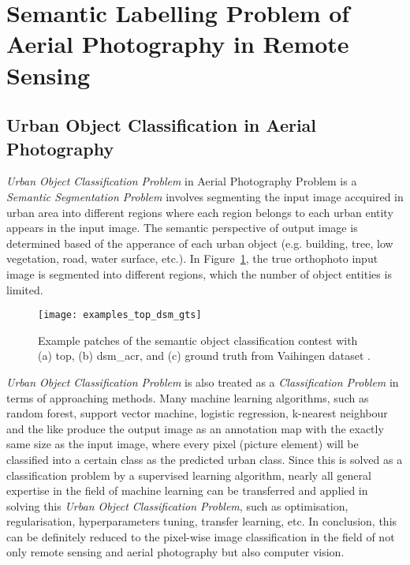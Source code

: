 \section{Semantic Labelling Problem of Aerial Photography in Remote Sensing}
\subsection{Urban Object Classification in Aerial Photography}
\emph{Urban Object Classification Problem} in Aerial Photography Problem is a
\emph{Semantic Segmentation Problem} involves segmenting the input image
accquired in urban area into different regions where each region belongs to
each urban entity appears in the input image. The semantic perspective of
output image is determined based of the apperance of each urban object (e.g.
building, tree, low vegetation, road, water surface, etc.). In
Figure~\ref{fig:examples_top_dsm_gts}, the true orthophoto input image is
segmented into different regions, which the number of object entities is
limited.
\begin{figure}[h]
    \centering
    \texttt{[image: examples\_top\_dsm\_gts]}
    \caption{
    Example patches of the semantic object classification contest with (a)
    \gls{top}, (b) \acrshort{dsm_acr}, and (c) ground truth from Vaihingen
    dataset \cite{vaihingen_isprs}.}
    \label{fig:examples_top_dsm_gts}
\end{figure}


\emph{Urban Object Classification Problem} is also treated as a
\emph{Classification Problem} in terms of approaching methods. Many machine
learning algorithms, such as random forest, support vector machine, logistic
regression, k-nearest neighbour and the like produce the output image as an
annotation map with the exactly same size as the input image, where every pixel
(picture element) will be classified into a certain class as the predicted
urban class. Since this is solved as a classification problem by a supervised
learning algorithm, nearly all general expertise in the field of machine
learning can be transferred and applied in solving this \emph{Urban Object
Classification Problem}, such as optimisation, regularisation, hyperparameters
tuning, transfer learning, etc. In conclusion, this can be definitely reduced
to the pixel-wise image classification in the field of not only remote sensing
and aerial photography but also computer vision.

